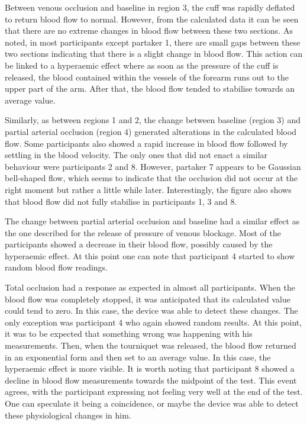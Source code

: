 Between venous occlusion and baseline in region 3, the cuff was rapidly deflated to return blood flow to normal. However, from the calculated data it can be seen that there are no extreme changes in blood flow between these two sections. As noted, in most participants except partaker 1, there are small gaps between these two sections indicating that there is a slight change in blood flow. This action can be linked to a hyperaemic effect where as soon as the pressure of the cuff is released, the blood contained within the vessels of the forearm runs out to the upper part of the arm. After that, the blood flow tended to stabilise towards an average value. 

Similarly, as between regions 1 and 2, the change between baseline (region 3) and partial arterial occlusion (region 4) generated alterations in the calculated blood flow. Some participants also showed a rapid increase in blood flow followed by settling in the blood velocity. The only ones that did not enact a similar behaviour were participants 2 and 8. However, partaker 7 appears to be Gaussian bell-shaped flow, which seems to indicate that the occlusion did not occur at the right moment but rather a little while later. Interestingly, the figure also shows that blood flow did not fully stabilise in participants 1, 3 and 8.

The change between partial arterial occlusion and baseline had a similar effect as the one described for the release of pressure of venous blockage. Most of the participants showed a decrease in their blood flow, possibly caused by the hyperaemic effect. At this point one can note that participant 4 started to show random blood flow readings. 

Total occlusion had a response as expected in almost all participants. When the blood flow was completely stopped, it was anticipated that its calculated value could tend to zero. In this case, the device was able to detect these changes. The only exception was participant 4 who again showed random results. At this point, it was to be expected that something wrong was happening with his measurements. Then, when the tourniquet was released, the blood flow returned in an exponential form and then set to an average value. In this case, the hyperaemic effect is more visible. It is worth noting that participant 8 showed a decline in blood flow measurements towards the midpoint of the test. This event agrees, with the participant expressing not feeling very well at the end of the test. One can speculate it being a coincidence, or maybe the device was able to detect these physiological changes in him.


